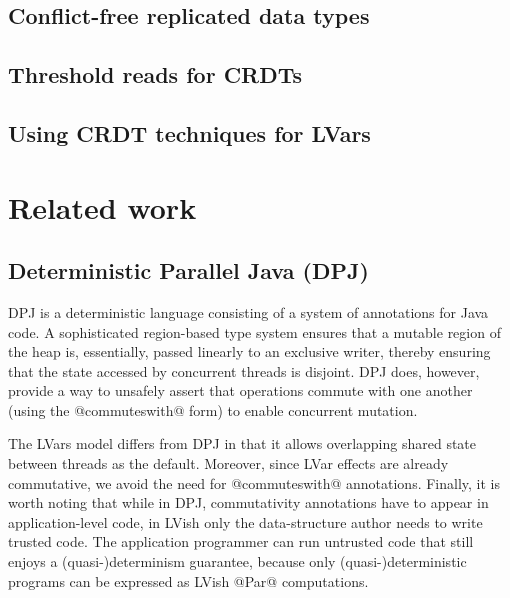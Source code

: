 \documentclass{article}
\begin{document}
\subsection{Conflict-free replicated data types}


\subsection{Threshold reads for CRDTs}


\subsection{Using CRDT techniques for LVars}


\section{Related work}\label{s:related}

\subsection{Deterministic Parallel Java (DPJ)}

DPJ \cite{dpj-oopsla, dpj-hotpar09} is a deterministic language
consisting of a system of annotations for Java code.  A sophisticated
region-based type system ensures that a mutable region of the heap is,
essentially, passed linearly to an exclusive writer, thereby ensuring
that the state accessed by concurrent threads is disjoint.  DPJ does,
however, provide a way to unsafely assert that operations commute with
one another (using the @commuteswith@ form) to enable concurrent
mutation.

The LVars model differs from DPJ in that it allows overlapping shared
state between threads as the default.  Moreover, since LVar effects
are already commutative, we avoid the need for @commuteswith@
annotations.  Finally, it is worth noting that while in DPJ,
commutativity annotations have to appear in application-level code, in
LVish only the data-structure author needs to write trusted code. The
application programmer can run untrusted code that still enjoys a
(quasi-)determinism guarantee, because only (quasi-)deterministic
programs can be expressed as LVish @Par@ computations.
\end{document}
